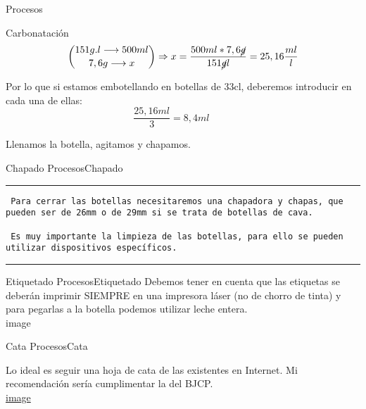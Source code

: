 \begin{frame}[fragile]{Procesos}
\begin{block}{Carbonatación}
\[\binom{151 g.l \longrightarrow 500 ml}{7,6 g  \longrightarrow  x} \Rightarrow x= \frac{500 ml * 7,6 \cancel{g}}{151\cancel{g}l} = 25,16 \frac{ml}{l}\]

Por lo que si estamos embotellando en botellas de 33cl, deberemos
introducir en cada una de ellas:\\

\[\frac{25,16 ml}{3} = 8,4 ml \hspace{1cm}\]

Llenamos la botella, agitamos y chapamos.
\end{block}

\begin{block}{Chapado}
\protect\hypertarget{chapado}{}
ProcesosChapado

\begin{center}\rule{0.5\linewidth}{0.5pt}\end{center}

\begin{verbatim}
 Para cerrar las botellas necesitaremos una chapadora y chapas, que pueden ser de 26mm o de 29mm si se trata de botellas de cava.
 
 Es muy importante la limpieza de las botellas, para ello se pueden utilizar dispositivos específicos.
\end{verbatim}

\begin{center}\rule{0.5\linewidth}{0.5pt}\end{center}
\end{block}

\begin{block}{Etiquetado}
\protect\hypertarget{etiquetado}{}
ProcesosEtiquetado Debemos tener en cuenta que las etiquetas se deberán
imprimir SIEMPRE en una impresora láser (no de chorro de tinta) y para
pegarlas a la botella podemos utilizar leche entera.\\
{image}
\end{block}

\begin{block}{Cata}
\protect\hypertarget{cata}{}
ProcesosCata

Lo ideal es seguir una hoja de cata de las existentes en Internet. Mi
recomendación sería cumplimentar la del BJCP.\\
\href{https://bjcp.org/intl/Exam-Scoresheet-ES.pdf}{{image}}
\end{block}
\end{frame}


